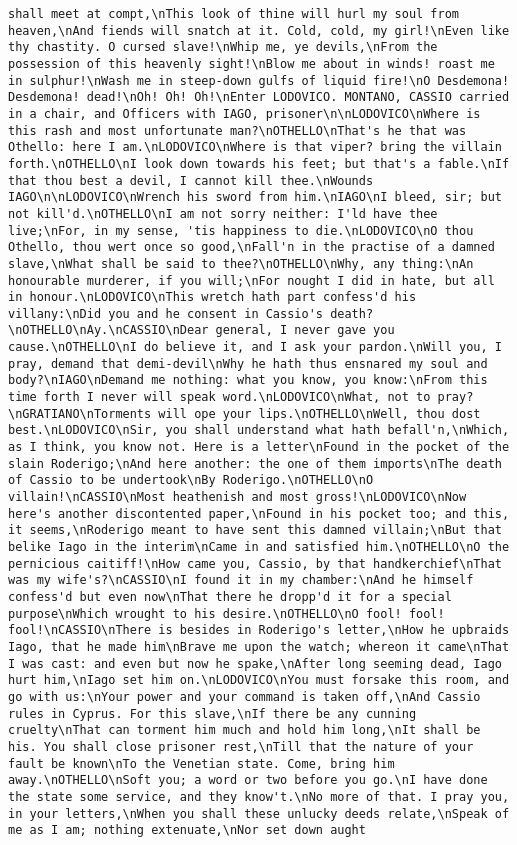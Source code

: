 \begin{verbatim}
shall meet at compt,\nThis look of thine will hurl my soul from heaven,\nAnd fiends will snatch at it. Cold, cold, my girl!\nEven like thy chastity. O cursed slave!\nWhip me, ye devils,\nFrom the possession of this heavenly sight!\nBlow me about in winds! roast me in sulphur!\nWash me in steep-down gulfs of liquid fire!\nO Desdemona! Desdemona! dead!\nOh! Oh! Oh!\nEnter LODOVICO. MONTANO, CASSIO carried in a chair, and Officers with IAGO, prisoner\n\nLODOVICO\nWhere is this rash and most unfortunate man?\nOTHELLO\nThat's he that was Othello: here I am.\nLODOVICO\nWhere is that viper? bring the villain forth.\nOTHELLO\nI look down towards his feet; but that's a fable.\nIf that thou best a devil, I cannot kill thee.\nWounds IAGO\n\nLODOVICO\nWrench his sword from him.\nIAGO\nI bleed, sir; but not kill'd.\nOTHELLO\nI am not sorry neither: I'ld have thee live;\nFor, in my sense, 'tis happiness to die.\nLODOVICO\nO thou Othello, thou wert once so good,\nFall'n in the practise of a damned slave,\nWhat shall be said to thee?\nOTHELLO\nWhy, any thing:\nAn honourable murderer, if you will;\nFor nought I did in hate, but all in honour.\nLODOVICO\nThis wretch hath part confess'd his villany:\nDid you and he consent in Cassio's death?\nOTHELLO\nAy.\nCASSIO\nDear general, I never gave you cause.\nOTHELLO\nI do believe it, and I ask your pardon.\nWill you, I pray, demand that demi-devil\nWhy he hath thus ensnared my soul and body?\nIAGO\nDemand me nothing: what you know, you know:\nFrom this time forth I never will speak word.\nLODOVICO\nWhat, not to pray?\nGRATIANO\nTorments will ope your lips.\nOTHELLO\nWell, thou dost best.\nLODOVICO\nSir, you shall understand what hath befall'n,\nWhich, as I think, you know not. Here is a letter\nFound in the pocket of the slain Roderigo;\nAnd here another: the one of them imports\nThe death of Cassio to be undertook\nBy Roderigo.\nOTHELLO\nO villain!\nCASSIO\nMost heathenish and most gross!\nLODOVICO\nNow here's another discontented paper,\nFound in his pocket too; and this, it seems,\nRoderigo meant to have sent this damned villain;\nBut that belike Iago in the interim\nCame in and satisfied him.\nOTHELLO\nO the pernicious caitiff!\nHow came you, Cassio, by that handkerchief\nThat was my wife's?\nCASSIO\nI found it in my chamber:\nAnd he himself confess'd but even now\nThat there he dropp'd it for a special purpose\nWhich wrought to his desire.\nOTHELLO\nO fool! fool! fool!\nCASSIO\nThere is besides in Roderigo's letter,\nHow he upbraids Iago, that he made him\nBrave me upon the watch; whereon it came\nThat I was cast: and even but now he spake,\nAfter long seeming dead, Iago hurt him,\nIago set him on.\nLODOVICO\nYou must forsake this room, and go with us:\nYour power and your command is taken off,\nAnd Cassio rules in Cyprus. For this slave,\nIf there be any cunning cruelty\nThat can torment him much and hold him long,\nIt shall be his. You shall close prisoner rest,\nTill that the nature of your fault be known\nTo the Venetian state. Come, bring him away.\nOTHELLO\nSoft you; a word or two before you go.\nI have done the state some service, and they know't.\nNo more of that. I pray you, in your letters,\nWhen you shall these unlucky deeds relate,\nSpeak of me as I am; nothing extenuate,\nNor set down aught 
\end{verbatim}
